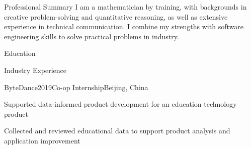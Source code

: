 \documentclass{resume}
\begin{document}
\begin{rSection}{Professional Summary}
I am a mathematician by training, with backgrounds in creative problem-solving and quantitative reasoning, as well as extensive experience in technical communication. 
I combine my strengths with software engineering skills to solve practical problems in industry.
\end{rSection}


\begin{rSection}{Education}
\smallskip
{}
\end{rSection}

\begin{rSection}{Industry Experience}
\begin{rSubsection}{ByteDance}{2019}{Co-op Internship}{Beijing, China}
\item Supported data-informed product development for an education technology product
\item Collected and reviewed educational data to support product analysis and application improvement
\end{rSubsection}
\end{rSection}
\vspace{0.25em}
\end{document}
